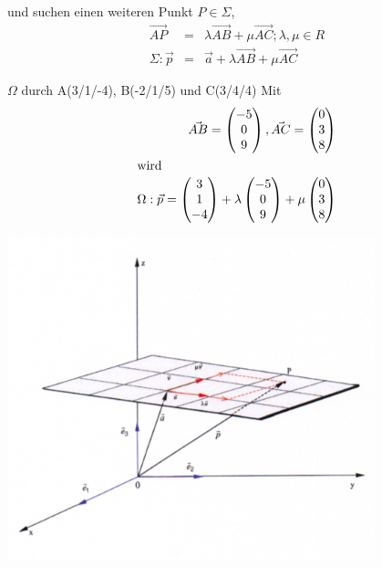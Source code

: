 und suchen einen weiteren Punkt $P \in \Sigma$,
\begin{eqnarray*}
	\vec{AP} &=& \lambda\vec{AB}+\mu\vec{AC}; \lambda, \mu \in R\\
	\Sigma: \vec{p} &=& \vec{a}+\lambda\vec{AB}+\mu\vec{AC}
\end{eqnarray*}
\begin{myexample}
	$\Omega$ durch A(3/1/-4), B(-2/1/5) und C(3/4/4)
	Mit
	\begin{eqnarray*}
		\vec{AB}= \begin{pmatrix}-5\\0\\9\end{pmatrix}, \vec{AC} = \begin{pmatrix}0\\3\\8\end{pmatrix}\\
		\shortintertext{wird} \Omega: \vec{p}=\begin{pmatrix}3\\1\\-4\end{pmatrix}+\lambda\begin{pmatrix}-5\\0\\9\end{pmatrix}+\mu\begin{pmatrix}0\\3\\8\end{pmatrix}
	\end{eqnarray*}
\end{myexample}
 \begin{center}
	 \includegraphics[width=0.8\textwidth]{imgs/parametergleichung_ebene.png}
 \end{center}
